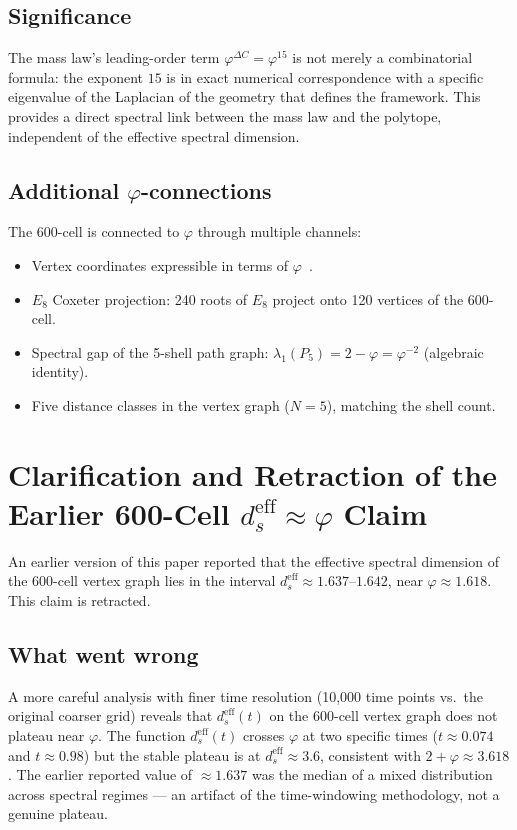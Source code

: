 \documentclass[12pt]{article}
\newcommand{\phig}{\varphi}
\newcommand{\dseff}{d_s^{\mathrm{eff}}}
\begin{document}
\subsection{Significance}

The mass law's leading-order term $\phig^{\Delta C} = \phig^{15}$ is not merely a combinatorial formula: the exponent $15$ is in exact numerical correspondence with a specific eigenvalue of the Laplacian of the geometry that defines the framework. This provides a direct spectral link between the mass law and the polytope, independent of the effective spectral dimension.

\subsection{Additional $\phig$-connections}

The 600-cell is connected to $\phig$ through multiple channels:
\begin{itemize}
    \item Vertex coordinates expressible in terms of $\phig$~\citep{Coxeter1973}.
    \item $E_8$ Coxeter projection: 240 roots of $E_8$ project onto 120 vertices of the 600-cell.
    \item Spectral gap of the 5-shell path graph: $\lambda_1(P_5) = 2 - \phig = \phig^{-2}$ (algebraic identity).
    \item Five distance classes in the vertex graph ($N = 5$), matching the shell count.
\end{itemize}

\section{Clarification and Retraction of the Earlier 600-Cell $\dseff \approx \phig$ Claim}\label{sec:retraction}

An earlier version of this paper reported that the effective spectral dimension of the 600-cell vertex graph lies in the interval $\dseff \approx 1.637$--$1.642$, near $\phig \approx 1.618$. This claim is retracted.

\subsection{What went wrong}

A more careful analysis with finer time resolution (10,000 time points vs.\ the original coarser grid) reveals that $\dseff(t)$ on the 600-cell vertex graph does not plateau near $\phig$. The function $\dseff(t)$ crosses $\phig$ at two specific times ($t \approx 0.074$ and $t \approx 0.98$) but the stable plateau is at $\dseff \approx 3.6$, consistent with $2 + \phig \approx 3.618$. The earlier reported value of $\approx 1.637$ was the median of a mixed distribution across spectral regimes --- an artifact of the time-windowing methodology, not a genuine plateau.
\end{document}
